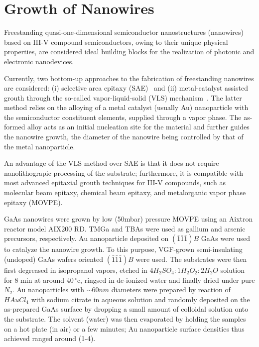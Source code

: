 \section{Growth of Nanowires}

Freestanding quasi-one-dimensional semiconductor nanostructures (nanowires)
based on III-V compound semiconductors, owing to their unique physical
properties, are considered ideal building blocks for the realization of
photonic and electronic nanodevices.

Currently, two bottom-up approaches to the fabrication of freestanding
nanowires are considered: (i) selective area epitaxy
(SAE)~\cite{motohisa2004catalyst} and (ii) metal-catalyst assisted grouth
through the so-called vapor-liquid-solid (VLS) mechanism~\cite{wagner1964vapor,
givargizov1975fundamental}. The latter method relies on the alloying of a metal
catalyst (usually Au) nanoparticle with the semiconductor constituent elements,
supplied through a vapor phase. The as-formed alloy acts as an initial
nucleation site for the material and further guides the nanowire growth, the
diameter of the nanowire being controlled by that of the metal nanoparticle.

An advantage of the VLS method over SAE is that it does not require
nanolithograpic processing of the substrate; furthermore, it is compatible with
most advanced epitaxial grouth techniques for III-V compounds, such as
molecular beam epitaxy, chemical beam epitaxy, and metalorganic vapor phase
epitaxy (MOVPE). 

GaAs nanowires were grown by low (50mbar) pressure MOVPE using an Aixtron
reactor model AIX200 RD. TMGa and TBAs were used as gallium and arsenic
precursors, respectively. Au nanoparticle deposited on
$(\bar{1}\bar{1}\bar{1})B$ GaAs were used to catalyze the nanowire growth. To
this purpose, VGF-grown semi-insulating (undoped) GaAs wafers oriented
$(\bar{1}\bar{1}\bar{1})B$ were used. The substrates were then first degreased
in isopropanol vapors, etched in $4H_2SO_4:1H_2O_2:2H_2O$ solution for 8 min at
around $40\,^{\circ}\mathrm{c}$, ringsed in de-ionized water and finally dried
under pure $N_2$. Au nanoparticles with $\sim 60 nm$ diameters were prepared by
reaction of $HAuCl_4$ with sodium citrate in aqueous solution and randomly
deposited on the as-prepared GaAs surface by dropping a small amount of
colloidal solution onto the substrate. The solvent (water) was then evaporated
by holding the samples on a hot plate (in air) or a few minutes; Au
nanoparticle surface densities thus achieved ranged around (1-4). 

